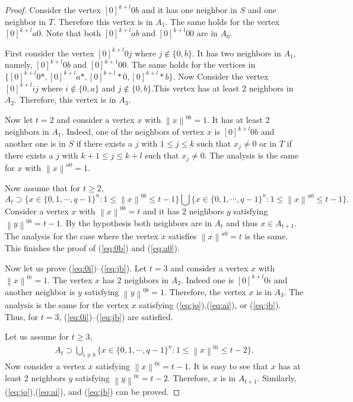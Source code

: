 \documentclass[reqno,11pt]{amsart}
\renewcommand{\leq}{\leqslant}
\renewcommand{\geq}{\geqslant}
\begin{document}
\begin{proof}
Consider the vertex $[0]^{k+l}0b$ and it has one neighbor in $S$ and one neighbor in $T$. Therefore this vertex is in $A_1$. The same holds for the vertex $[0]^{k+l}a0$. Note that both $[0]^{k+l}ab$
and $[0]^{k+l}00$ are in $A_0$. 

First consider the vertex $[0]^{k+l}0j$ where $j \notin \{0,b\}$. It has two neighbors in $A_1$, namely, $[0]^{k+l}0b$ and $[0]^{k+1}00$. The same holds for the vertices in $\{[0]^{k+l}0*,[0]^{k+l}a*,[0]^{k+l}*0,[0]^{k+l}*b\}$. Now Consider the vertex $[0]^{k+l}ij$ where $i \notin \{0,a\}$ and $j \notin \{0,b\}$.This vertex has at least 2 neighbors in $A_2$. Therefore, this vertex is in $A_3$.

Now let $t=2$ and consider a vertex $x$ with $\left \lVert x \right \rVert^{0b}=1$. It has at least 2 neighbors in $A_1$. Indeed, one of the neighbors of vertex $x$ is $[0]^{k+l}0b$ and another one is in $S$ if there exists a $j$ with  $ 1 \leq j \leq k$ such that $x_j \neq 0$  or in $T$ if there exists a $j$ with $ k+1 \leq j \leq k+l$ such that $x_j \neq 0$. The analysis is the same for $x$ with $\left \lVert x \right \rVert^{a0}=1$.

Now assume that for $t \geq 2$, 
\begin{equation*}
 A_t \supset \{x \in \{0,1,\cdots,q-1\}^n:  1 \leq \left \lVert x \right \rVert^{0b} \leq t-1\}\bigcup \{x \in \{0,1,\cdots,q-1\}^n:  1 \leq \left \lVert x \right \rVert^{a0} \leq t-1\}.
\end{equation*}
Consider a vertex $x$ with $\left \lVert x \right \rVert^{0b}=t$ and it has 2 neighbors $y$ satisfying $\left \lVert y \right \rVert^{0b}=t-1$. By the hypothesis both neighbors are in $A_t$ and thus $x \in A_{t+1}$. The analysis for the case where the vertex $x$ satisfies $\left \lVert x \right \rVert^{a0}=t$ is the same. This finishes the proof of (\ref{eq:0b}) and (\ref{eq:a0}). 

Now let us prove (\ref{eq:0i})--(\ref{eq:jb}). Let $t=3$ and consider a vertex $x$ with $\left \lVert x \right \rVert^{0i}=1$. The vertex $x$ has 2 neighbors in $A_2$. Indeed one is $[0]^{k+l}0i$ and another neighbor is $y$ satisfying $\left \lVert y \right \rVert^{0b}=1$. Therefore, the vertex $x$ is in $A_3$. The analysis is the same for the vertex $x$ satisfying (\ref{eq:jo}),(\ref{eq:ai}), or (\ref{eq:jb}). Thus, for $t=3$, (\ref{eq:0i})--(\ref{eq:jb}) are satisfied. 

Let us assume for $t \geq 3$,
\begin{align*}
A_t \supset \bigcup_{i \neq b} \{x \in \{0,1,\cdots,q-1\}^n:  1 \leq \left \lVert x \right \rVert^{0i} \leq t-2\}. 
\end{align*}
Now consider a vertex $x$ satisfying $\left \lVert x \right \rVert^{0i}=t-1$. It is easy to see that $x$ has at least 2 neighbors $y$ satisfying $\left \lVert y \right \rVert^{0i}=t-2$. Therefore, $x$ is in $A_{t+1}$. Similarly, (\ref{eq:jo}),(\ref{eq:ai}), and (\ref{eq:jb}) can be proved.


\end{proof}
\end{document}
